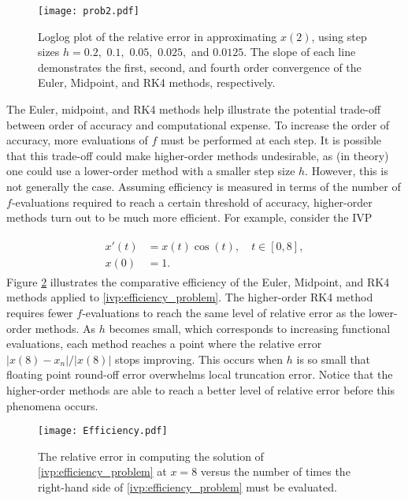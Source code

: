 \begin{figure}[H]
\centering
\texttt{[image: prob2.pdf]}
\caption{Loglog plot of the relative error in approximating $x(2)$, using step sizes $h = 0.2,$ $0.1,$ $0.05,$ $0.025,$ and $0.0125$.
The slope of each line demonstrates the first, second, and fourth order convergence of the Euler, Midpoint, and RK4 methods, respectively.}
\label{ivp:relative_error}
\end{figure}

The Euler, midpoint, and RK4 methods help illustrate the potential trade-off between order of accuracy and computational expense.
To increase the order of accuracy, more evaluations of $f$ must be performed at each step.
It is possible that this trade-off could make higher-order methods undesirable, as (in theory) one could use a lower-order method with a smaller step size $h$.
However, this is not generally the case.
Assuming efficiency is measured in terms of the number of $f$-evaluations required to reach a certain threshold of accuracy, higher-order methods turn out to be much more efficient.
For example, consider the IVP

\begin{align}
	\begin{split}
		x'(t) &= x(t) \cos(t), \quad t \in [0,8],\\
		x(0) &= 1. 
	\end{split}
	\label{ivp:efficiency_problem}
\end{align}
Figure \ref{ivp:efficiency_figure} illustrates the comparative efficiency of the Euler, Midpoint, and RK4 methods applied to \eqref{ivp:efficiency_problem}. 
The higher-order RK4 method requires fewer $f$-evaluations to reach the same level of relative error as the lower-order methods.
As $h$ becomes small, which corresponds to increasing functional evaluations, each method reaches a point where the relative error $|x(8)-x_n|/{|x(8)|}$ stops improving.
This occurs when $h$ is so small that floating point round-off error overwhelms local truncation error. Notice that the higher-order methods are able to reach a better level of relative error before this phenomena occurs.

\begin{figure}[H]
\centering
\texttt{[image: Efficiency.pdf]}
\caption{The relative error in computing the solution of \eqref{ivp:efficiency_problem} at $x = 8$ versus the number of times the right-hand side of \eqref{ivp:efficiency_problem} must be evaluated.  }
\label{ivp:efficiency_figure}
\end{figure}

